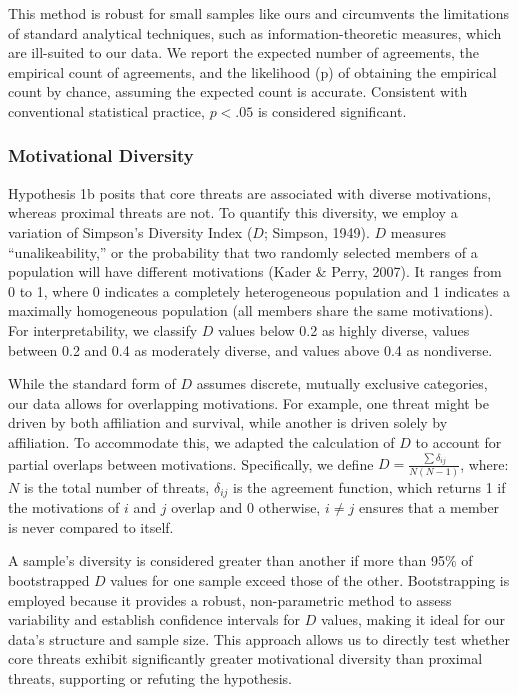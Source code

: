 \documentclass[
  man,floatsintext]{apa7}
\begin{document}
This method is robust for small samples like ours and circumvents the limitations of standard analytical techniques, such as information-theoretic measures, which are ill-suited to our data.
We report the expected number of agreements, the empirical count of agreements, and the likelihood (p) of obtaining the empirical count by chance, assuming the expected count is accurate.
Consistent with conventional statistical practice, \(p<.05\) is considered significant.

\subsubsection{Motivational Diversity}\label{motivational-diversity}

Hypothesis 1b posits that core threats are associated with diverse motivations, whereas proximal threats are not.
To quantify this diversity, we employ a variation of Simpson's Diversity Index (\(D\); Simpson, 1949).
\(D\) measures ``unalikeability,'' or the probability that two randomly selected members of a population will have different motivations (Kader \& Perry, 2007).
It ranges from 0 to 1, where 0 indicates a completely heterogeneous population and 1 indicates a maximally homogeneous population (all members share the same motivations).
For interpretability, we classify \(D\) values below 0.2 as highly diverse, values between 0.2 and 0.4 as moderately diverse, and values above 0.4 as nondiverse.

While the standard form of \(D\) assumes discrete, mutually exclusive categories, our data allows for overlapping motivations.
For example, one threat might be driven by both affiliation and survival, while another is driven solely by affiliation.
To accommodate this, we adapted the calculation of \(D\) to account for partial overlaps between motivations.
Specifically, we define \(D = \frac{\sum \delta_{ij}}{N(N-1)}\), where: \(N\) is the total number of threats, \(\delta_{ij}\) is the agreement function, which returns 1 if the motivations of \(i\) and \(j\) overlap and 0 otherwise, \(i \neq j\) ensures that a member is never compared to itself.

A sample's diversity is considered greater than another if more than 95\% of bootstrapped \(D\) values for one sample exceed those of the other.
Bootstrapping is employed because it provides a robust, non-parametric method to assess variability and establish confidence intervals for \(D\) values, making it ideal for our data's structure and sample size.
This approach allows us to directly test whether core threats exhibit significantly greater motivational diversity than proximal threats, supporting or refuting the hypothesis.
\end{document}

